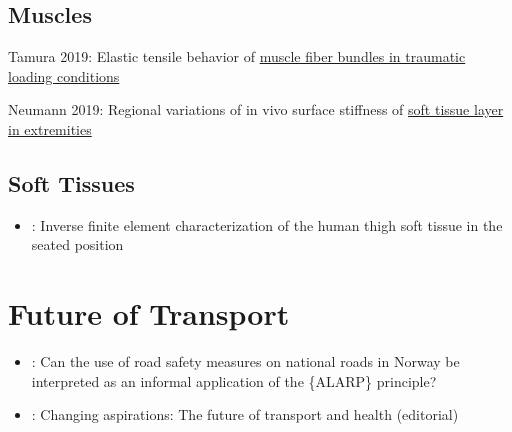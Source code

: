 \documentclass[]{book}
\providecommand{\tightlist}{%
  \setlength{\itemsep}{0pt}\setlength{\parskip}{0pt}}
\begin{document}
\hypertarget{muscles}{%
\section{Muscles}\label{muscles}}

Tamura 2019: Elastic tensile behavior of \href{https://www.sciencedirect.com/science/article/pii/S0268003318307083}{muscle fiber bundles in traumatic loading conditions}

Neumann 2019: Regional variations of in vivo surface stiffness of \href{https://www.sciencedirect.com/science/article/pii/S0021929019305135?dgcid=raven_sd_aip_email}{soft tissue layer in extremities}

\hypertarget{soft-tissues}{%
\section{Soft Tissues}\label{soft-tissues}}

\begin{itemize}
\tightlist
\item
  \citet{Chen2019}: Inverse finite element characterization of the human thigh soft tissue in the seated position
\end{itemize}

\hypertarget{future-of-transport}{%
\chapter{Future of Transport}\label{future-of-transport}}

\begin{itemize}
\item
  \citet{Selvik2020}: Can the use of road safety measures on national roads in Norway be interpreted as an informal application of the \{ALARP\} principle?
\item
  \citet{Mindell2019}: Changing aspirations: The future of transport and health (editorial)
\end{itemize}


\end{document}
